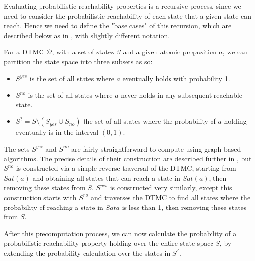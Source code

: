 Evaluating probabilistic reachability properties is a recursive process, since we need to consider the probabilistic reachability of each state that a given state can reach. Hence we need to define the "base cases" of this recursion, which are described below as in \cite{kwiatkowska_stochastic_2007}, with slightly different notation.

\begin{definition}
\label{back:S_yes}

    For a DTMC $\mathcal{D}$, with a set of states $S$ and a given atomic proposition $a$, we can partition the state space into three subsets as so:

    \begin{itemize}
        
        \item $S^{yes}$ is the set of all states where $a$ eventually holds with probability 1.
        \item $S^{no}$ is the set of all states where $a$ never holds in any subsequent reachable state.
        \item $S^{?} = S \setminus (S_{yes} \cup S_{no})$ the set of all states where the probability of $a$ holding eventually is in the interval $(0,1)$.

    \end{itemize}

\end{definition}

The sets $S^{yes}$ and $S^{no}$ are fairly straightforward to compute using graph-based algorithms. The precise details of their construction are described further in \cite{kwiatkowska_stochastic_2007}, but $S^{no}$ is constructed via a simple reverse traversal of the DTMC, starting from $Sat(a)$ and obtaining all states that can reach a state in $Sat(a)$, then removing these states from $S$. $S^{yes}$ is constructed very similarly, except this construction starts with $S^{no}$ and traverses the DTMC to find all states where the probability of reaching a state in $Sat{a}$ is less than 1, then removing these states from $S$.

After this precomputation process, we can now calculate the probability of a probabilistic reachability property holding over the entire state space $S$, by extending the probability calculation over the states in $S^{?}$.


